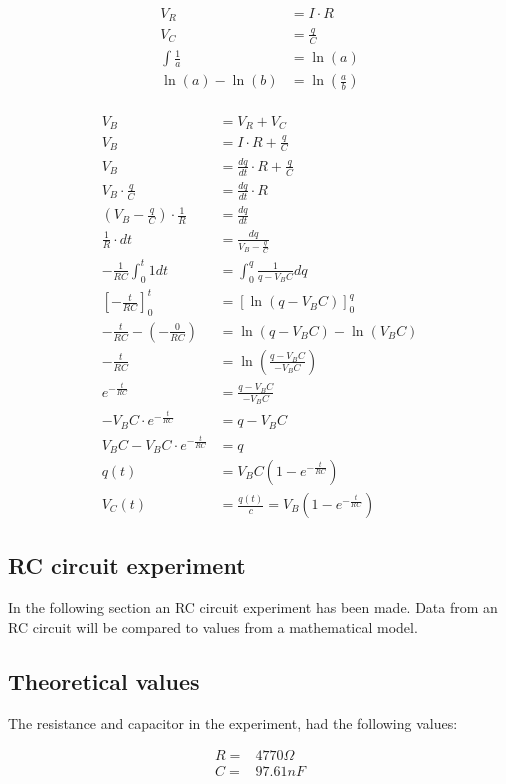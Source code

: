 \begin{align*}
V_R &= I \cdot R \\
V_C &= \frac{q}{C} \\
\int \frac{1}{a} &= \ln(a) \\
\ln(a) - \ln(b) &= \ln(\frac{a}{b})
\end{align*}
\\
\begin{align*}
V_B &= V_R + V_C \\
V_B &= I \cdot R + \frac{q}{C} \\
V_B &= \frac{dq}{dt} \cdot R + \frac{q}{C} \\
V_B \cdot \frac{q}{C} &= \frac{dq}{dt} \cdot R \\
(V_B - \frac{q}{C}) \cdot \frac{1}{R} &= \frac{dq}{dt} \\
\frac{1}{R} \cdot dt &= \frac{dq}{V_B - \frac{q}{C}} \\
- \frac{1}{RC} \int_{0}^{t} 1 dt &= \int_{0}^{q} \frac{1}{q-V_B C}dq \\
[-\frac{t}{RC}]_{0}^{t} &= [\ln(q-V_B C)]_{0}^{q} \\
-\frac{t}{RC} - (-\frac{0}{RC}) &= \ln(q-V_B C) - \ln(V_B C) \\
-\frac{t}{RC} &= \ln(\frac{q-V_B C}{-V_B C}) \\
e^{-\frac{t}{RC}} &= \frac{q-V_B C}{-V_B C} \\
-V_B C \cdot e^{-\frac{t}{RC}} &= q - V_B C \\
V_B C - V_B C \cdot e^{-\frac{t}{RC}} &= q \\
q(t) &= V_B C(1-e^{-\frac{t}{RC}}) \\
V_C(t) &= \frac{q(t)}{c} = V_B (1 - e^{-\frac{t}{RC}})
\end{align*}

\subsection{RC circuit experiment}
In the following section an RC circuit experiment has been made. Data from an RC circuit will be compared to values from a mathematical model. \\

\subsection{Theoretical values}
The resistance and capacitor in the experiment, had the following values:

\begin{align*}
 R =& 4770\Omega \\
 C =& 97.61nF
\end{align*}

